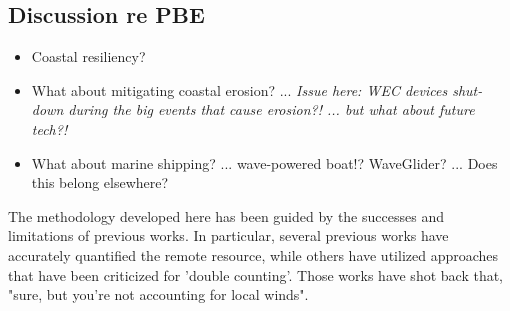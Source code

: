 

\subsection{Discussion re PBE}

\begin{itemize}
\item Coastal resiliency?
\item What about mitigating coastal erosion? ... {\it Issue here: WEC devices shut-down during the big events that cause erosion?! ... but what about future tech?!}
\item What about marine shipping? ... wave-powered boat!? WaveGlider? ... Does this belong elsewhere?
\end{itemize}

The methodology developed here has been guided by the successes and limitations of previous works. In particular, several previous works have accurately quantified the remote resource, while others have utilized approaches that have been criticized for 'double counting'. Those works have shot back that, "sure, but you're not accounting for local winds".


